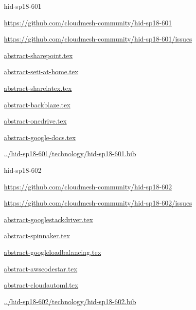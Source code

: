 \begin{IU}

hid-sp18-601

\url{https://github.com/cloudmesh-community/hid-sp18-601}

\url{https://github.com/cloudmesh-community/hid-sp18-601/issues}

\href{https://github.com/cloudmesh-community/hid-sp18-601/blob/master//technology/abstract-sharepoint.tex}{abstract-sharepoint.tex}

\href{https://github.com/cloudmesh-community/hid-sp18-601/blob/master//technology/abstract-seti-at-home.tex}{abstract-seti-at-home.tex}

\href{https://github.com/cloudmesh-community/hid-sp18-601/blob/master//technology/abstract-sharelatex.tex}{abstract-sharelatex.tex}

\href{https://github.com/cloudmesh-community/hid-sp18-601/blob/master//technology/abstract-backblaze.tex}{abstract-backblaze.tex}

\href{https://github.com/cloudmesh-community/hid-sp18-601/blob/master//technology/abstract-onedrive.tex}{abstract-onedrive.tex}

\href{https://github.com/cloudmesh-community/hid-sp18-601/blob/master//technology/abstract-google-docs.tex}{abstract-google-docs.tex}

\href{https://github.com/cloudmesh-community/hid-sp18-601/blob/master//technology/hid-sp18-601.bib}{../hid-sp18-601/technology/hid-sp18-601.bib}

\end{IU}


\begin{IU}

hid-sp18-602

\url{https://github.com/cloudmesh-community/hid-sp18-602}

\url{https://github.com/cloudmesh-community/hid-sp18-602/issues}

\href{https://github.com/cloudmesh-community/hid-sp18-602/blob/master//technology/abstract-googlestackdriver.tex}{abstract-googlestackdriver.tex}

\href{https://github.com/cloudmesh-community/hid-sp18-602/blob/master//technology/abstract-spinnaker.tex}{abstract-spinnaker.tex}

\href{https://github.com/cloudmesh-community/hid-sp18-602/blob/master//technology/abstract-googleloadbalancing.tex}{abstract-googleloadbalancing.tex}

\href{https://github.com/cloudmesh-community/hid-sp18-602/blob/master//technology/abstract-awscodestar.tex}{abstract-awscodestar.tex}

\href{https://github.com/cloudmesh-community/hid-sp18-602/blob/master//technology/abstract-cloudautoml.tex}{abstract-cloudautoml.tex}

\href{https://github.com/cloudmesh-community/hid-sp18-602/blob/master//technology/hid-sp18-602.bib}{../hid-sp18-602/technology/hid-sp18-602.bib}

\end{IU}
